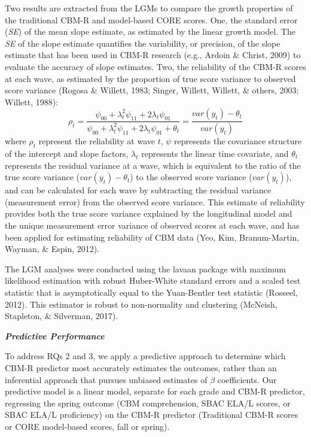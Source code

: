 \documentclass[
  english,
  man, fleqn, noextraspace]{apa6}
\begin{document}
Two results are extracted from the LGMs to compare the growth properties of the traditional CBM-R and model-based CORE scores. One, the standard error (\emph{SE}) of the mean slope estimate, as estimated by the linear growth model. The \emph{SE} of the slope estimate quantifies the variability, or precision, of the slope estimate that has been used in CBM-R research (e.g., Ardoin \& Christ, 2009) to evaluate the accuracy of slope estimates. Two, the reliability of the CBM-R scores at each wave, as estimated by the proportion of true score variance to observed score variance (Rogosa \& Willett, 1983; Singer, Willett, Willett, \& others, 2003; Willett, 1988):
\[
\rho_t = \frac{\psi_{00} + \lambda^2_t \psi_{11} + 2\lambda_t \psi_{01}}{\psi_{00} + \lambda^2_t \psi_{11} + 2\lambda_t \psi_{01} + \theta_t} = \frac{var(y_t) - \theta_t}{var(y_t)}
\]
where \(\rho_t\) represent the reliability at wave \(t\), \(\psi\) represents the covariance structure of the intercept and slope factors, \(\lambda_t\) represents the linear time covariate, and \(\theta_t\) represents the residual variance at a wave, which is equivalent to the ratio of the true score variance (\(var(y_t) - \theta_t\)) to the observed score variance (\(var(y_t)\)), and can be calculated for each wave by subtracting the residual variance (measurement error) from the observed score variance. This estimate of reliability provides both the true score variance explained by the longitudinal model and the unique measurement error variance of observed scores at each wave, and has been applied for estimating reliability of CBM data (Yeo, Kim, Branum-Martin, Wayman, \& Espin, 2012).

The LGM analyses were conducted using the lavaan package with maximum likelihood estimation with robust Huber-White standard errors and a scaled test statistic that is asymptotically equal to the Yuan-Bentler test statistic (Rosseel, 2012). This estimator is robust to non-normality and clustering (McNeish, Stapleton, \& Silverman, 2017).

\textbf{\emph{Predictive Performance}}

To address RQs 2 and 3, we apply a predictive approach to determine which CBM-R predictor most accurately estimates the outcomes, rather than an inferential approach that pursues unbiased estimates of \(\beta\) coefficients. Our predictive model is a linear model, separate for each grade and CBM-R predictor, regressing the spring outcome (CBM comprehension, SBAC ELA/L scores, or SBAC ELA/L proficiency) on the CBM-R predictor (Traditional CBM-R scores or CORE model-based scores, fall or spring).
\end{document}
